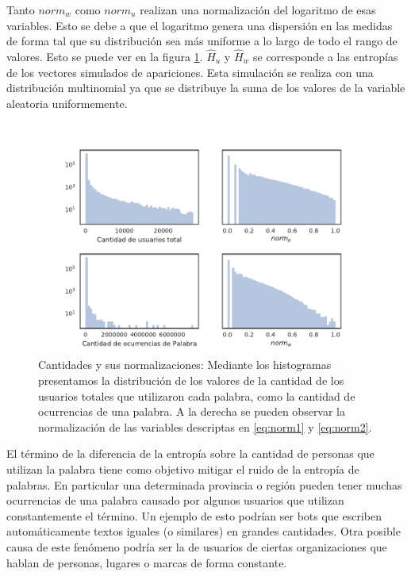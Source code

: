 Tanto $norm_{w}$ como $norm_{u}$ realizan una normalización del logaritmo de esas variables. Esto se debe a que el logaritmo genera una dispersión en las medidas de forma tal que su distribución sea más uniforme a lo largo de todo el rango de valores. Esto se puede ver en la figura \ref{fig:cantNorms}.
$\widehat{H}_{u}$ y $\widehat{H}_{w}$ se corresponde a las entropías de los vectores simulados de apariciones.
Esta simulación se realiza con una distribución multinomial ya que se distribuye la suma de los valores de la variable aleatoria uniformemente. 


\begin{figure}[!ht]
\centering
\includegraphics[width=1.0\textwidth]{./images/train/sinFiltro/cantNorms_sinFiltro.pdf}
\caption{Cantidades y sus normalizaciones: Mediante los histogramas presentamos la distribución de los valores de la cantidad de los usuarios totales que utilizaron cada palabra, como la cantidad de ocurrencias de una palabra. A la derecha se pueden observar la normalización de las variables descriptas en \ref{eq:norm1} y \ref{eq:norm2}.} 
\label{fig:cantNorms} 
\end{figure}

El término de la diferencia de la entropía sobre la cantidad de personas que utilizan la palabra tiene como objetivo mitigar el ruido de la entropía de palabras. En particular una determinada provincia o región pueden tener muchas ocurrencias de una palabra causado por algunos usuarios que utilizan constantemente el término. Un ejemplo de esto podrían ser bots que escriben automáticamente textos iguales (o similares) en grandes cantidades. Otra posible causa de este fenómeno podría ser la de usuarios de ciertas organizaciones que hablan de personas, lugares o marcas de forma constante.

